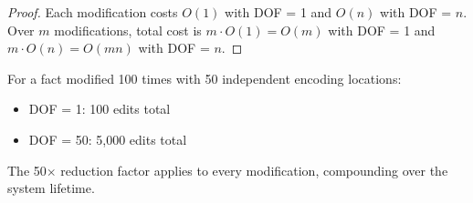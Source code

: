\begin{proof}
Each modification costs $O(1)$ with DOF = 1 and $O(n)$ with DOF = $n$. Over $m$ modifications, total cost is $m \cdot O(1) = O(m)$ with DOF = 1 and $m \cdot O(n) = O(mn)$ with DOF = $n$.
\end{proof}

For a fact modified 100 times with 50 independent encoding locations:
\begin{itemize}
\tightlist
\item DOF = 1: 100 edits total
\item DOF = 50: 5,000 edits total
\end{itemize}

The 50$\times$ reduction factor applies to every modification, compounding over the system lifetime.

